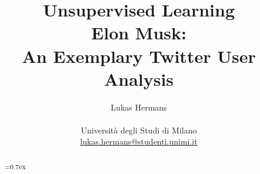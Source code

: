 \title{\large Unsupervised Learning \\ \LARGE
 Elon Musk:\\An Exemplary Twitter User Analysis}
\author{Lukas Hermans\\ \\
{Università degli Studi di Milano} \\
\href{mailto:lukas.hermans@studenti.unimi.it}
{lukas.hermans@studenti.unimi.it}}

\maketitle

\begin{abstract} 
\noindent
{}\font=0.7ex%

\end{abstract}
